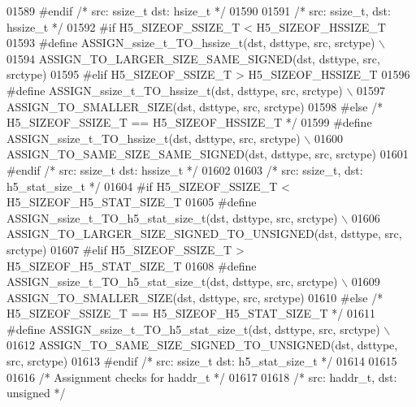 \begin{DoxyCode}
01589 \textcolor{preprocessor}{#endif }\textcolor{comment}{/* src: ssize\_t dst: hsize\_t */}\textcolor{preprocessor}{}
01590 
01591 \textcolor{comment}{/* src: ssize\_t, dst: hssize\_t */}
01592 \textcolor{preprocessor}{#if H5\_SIZEOF\_SSIZE\_T < H5\_SIZEOF\_HSSIZE\_T}
01593 \textcolor{preprocessor}{    #define ASSIGN\_ssize\_t\_TO\_hssize\_t(dst, dsttype, src, srctype) \(\backslash\)}
01594 \textcolor{preprocessor}{        ASSIGN\_TO\_LARGER\_SIZE\_SAME\_SIGNED(dst, dsttype, src, srctype)}
01595 \textcolor{preprocessor}{#elif H5\_SIZEOF\_SSIZE\_T > H5\_SIZEOF\_HSSIZE\_T}
01596 \textcolor{preprocessor}{    #define ASSIGN\_ssize\_t\_TO\_hssize\_t(dst, dsttype, src, srctype) \(\backslash\)}
01597 \textcolor{preprocessor}{        ASSIGN\_TO\_SMALLER\_SIZE(dst, dsttype, src, srctype)}
01598 \textcolor{preprocessor}{#else }\textcolor{comment}{/* H5\_SIZEOF\_SSIZE\_T == H5\_SIZEOF\_HSSIZE\_T */}\textcolor{preprocessor}{}
01599 \textcolor{preprocessor}{    #define ASSIGN\_ssize\_t\_TO\_hssize\_t(dst, dsttype, src, srctype) \(\backslash\)}
01600 \textcolor{preprocessor}{        ASSIGN\_TO\_SAME\_SIZE\_SAME\_SIGNED(dst, dsttype, src, srctype)}
01601 \textcolor{preprocessor}{#endif }\textcolor{comment}{/* src: ssize\_t dst: hssize\_t */}\textcolor{preprocessor}{}
01602 
01603 \textcolor{comment}{/* src: ssize\_t, dst: h5\_stat\_size\_t */}
01604 \textcolor{preprocessor}{#if H5\_SIZEOF\_SSIZE\_T < H5\_SIZEOF\_H5\_STAT\_SIZE\_T}
01605 \textcolor{preprocessor}{    #define ASSIGN\_ssize\_t\_TO\_h5\_stat\_size\_t(dst, dsttype, src, srctype) \(\backslash\)}
01606 \textcolor{preprocessor}{        ASSIGN\_TO\_LARGER\_SIZE\_SIGNED\_TO\_UNSIGNED(dst, dsttype, src, srctype)}
01607 \textcolor{preprocessor}{#elif H5\_SIZEOF\_SSIZE\_T > H5\_SIZEOF\_H5\_STAT\_SIZE\_T}
01608 \textcolor{preprocessor}{    #define ASSIGN\_ssize\_t\_TO\_h5\_stat\_size\_t(dst, dsttype, src, srctype) \(\backslash\)}
01609 \textcolor{preprocessor}{        ASSIGN\_TO\_SMALLER\_SIZE(dst, dsttype, src, srctype)}
01610 \textcolor{preprocessor}{#else }\textcolor{comment}{/* H5\_SIZEOF\_SSIZE\_T == H5\_SIZEOF\_H5\_STAT\_SIZE\_T */}\textcolor{preprocessor}{}
01611 \textcolor{preprocessor}{    #define ASSIGN\_ssize\_t\_TO\_h5\_stat\_size\_t(dst, dsttype, src, srctype) \(\backslash\)}
01612 \textcolor{preprocessor}{        ASSIGN\_TO\_SAME\_SIZE\_SIGNED\_TO\_UNSIGNED(dst, dsttype, src, srctype)}
01613 \textcolor{preprocessor}{#endif }\textcolor{comment}{/* src: ssize\_t dst: h5\_stat\_size\_t */}\textcolor{preprocessor}{}
01614 
01615 
01616 \textcolor{comment}{/* Assignment checks for haddr\_t */}
01617 
01618 \textcolor{comment}{/* src: haddr\_t, dst: unsigned */}

\end{DoxyCode}
